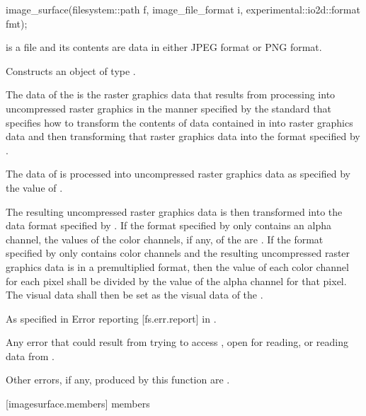 \begin{itemdecl}
image_surface(filesystem::path f, image_file_format i,
  experimental::io2d::format fmt);
\end{itemdecl}
\begin{itemdescr}
\pnum
\preconditions
{} is a file and its contents are data in either JPEG format or PNG format.

\pnum
\effects
Constructs an object of type .

\pnum
The data of the \underlyingimagesurface is the raster graphics data that results from processing  into uncompressed raster graphics in the manner specified by the standard that specifies how to transform the contents of data contained in  into raster graphics data and then transforming that raster graphics data into the format specified by .

\pnum
The data of  is processed into uncompressed raster graphics data as specified by the value of .

\pnum
The resulting uncompressed raster graphics data is then transformed into the data format specified by . If the format specified by  only contains an alpha channel, the values of the color channels, if any, of the \underlyingimagesurface are \unspecnorm. If the format specified by  only contains color channels and the resulting uncompressed raster graphics data is in a premultiplied format, then the value of each color channel for each pixel shall be divided by the value of the alpha channel for that pixel. The visual data shall then be set as the visual data of the \underlyingimagesurface.

\pnum
\throws
As specified in Error reporting [fs.err.report] in \cppseventeen.

\pnum
\errors
Any error that could result from trying to access , open  for reading, or reading data from .

\pnum
Other errors, if any, produced by this function are .
\end{itemdescr}

 [imagesurface.members] { members}

